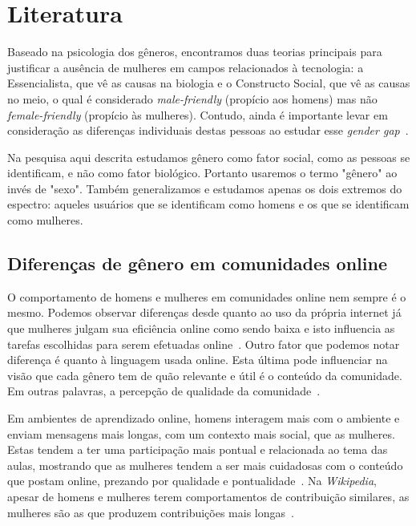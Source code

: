 \chapter{Literatura}
\label{ch:literatura}

Baseado na psicologia dos gêneros, encontramos duas teorias principais para justificar a ausência de mulheres em campos relacionados à tecnologia: a Essencialista, que vê as causas na biologia e o Constructo Social, que vê as causas no meio, o qual é considerado \emph{male-friendly} (propício aos homens) mas não \emph{female-friendly} (propício às mulheres). Contudo, ainda é importante levar em consideração as diferenças individuais destas pessoas ao estudar esse \emph{gender gap}~\cite{trauth2004understanding}.

Na pesquisa aqui descrita estudamos gênero como fator social, como as pessoas se identificam, e não como fator biológico. Portanto usaremos o termo "gênero" ao invés de "sexo". Também generalizamos e estudamos apenas os dois extremos do espectro: aqueles usuários que se identificam como homens e os que se identificam como mulheres. 

\section{Diferenças de gênero em comunidades online}

O comportamento de homens e mulheres em comunidades online nem sempre é o mesmo. Podemos observar diferenças desde quanto ao uso da própria internet já que mulheres julgam sua eficiência online como sendo baixa e isto influencia as tarefas escolhidas para serem efetuadas online~\cite{hargittai2006differences}. Outro fator que podemos notar diferença é quanto à linguagem usada online. Esta última pode influenciar na visão que cada gênero tem  de quão relevante e útil é o conteúdo da comunidade. Em outras palavras, a percepção de qualidade da comunidade~\cite{Gefen:2005:YSS:1066149.1066156}. 

Em ambientes de aprendizado online, homens interagem mais com o ambiente e enviam mensagens mais longas, com um contexto mais social, que as mulheres. Estas tendem a ter uma participação mais pontual e relacionada ao tema das aulas, mostrando que as mulheres tendem a ser mais cuidadosas com o conteúdo que postam online, prezando por qualidade e pontualidade~\cite{barrett1999gender}. Na \emph{Wikipedia}, apesar de homens e mulheres terem comportamentos de contribuição similares, as mulheres são as que produzem contribuições mais longas~\cite{glott2010wikipedia}.

